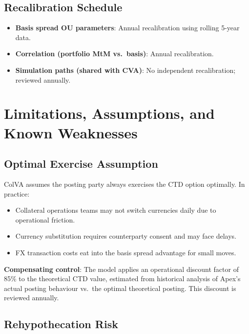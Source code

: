 \documentclass[11pt,a4paper]{article}
\begin{document}
\subsection{Recalibration Schedule}

\begin{itemize}[leftmargin=*]
  \item \textbf{Basis spread OU parameters}: Annual recalibration using rolling 5-year data.
  \item \textbf{Correlation (portfolio MtM vs.\ basis)}: Annual recalibration.
  \item \textbf{Simulation paths (shared with CVA)}: No independent recalibration; reviewed annually.
\end{itemize}

\section{Limitations, Assumptions, and Known Weaknesses}

\subsection{Optimal Exercise Assumption}

ColVA assumes the posting party always exercises the CTD option optimally. In practice:
\begin{itemize}[leftmargin=*]
  \item Collateral operations teams may not switch currencies daily due to operational friction.
  \item Currency substitution requires counterparty consent and may face delays.
  \item FX transaction costs eat into the basis spread advantage for small moves.
\end{itemize}

\textbf{Compensating control}: The model applies an operational discount factor of 85\% to
the theoretical CTD value, estimated from historical analysis of Apex's actual posting
behaviour vs.\ the optimal theoretical posting. This discount is reviewed annually.

\subsection{Rehypothecation Risk}
\end{document}
